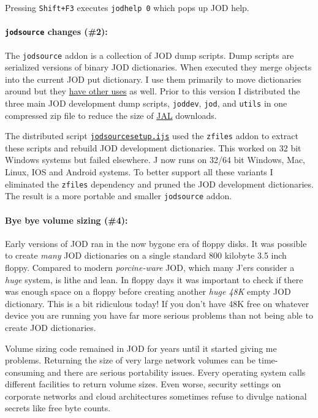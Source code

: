 \noindent Pressing \texttt{Shift+F3} executes \texttt{jodhelp\ 0} which pops up
JOD help.

\paragraph{\texorpdfstring{\texttt{jodsource} changes
(\#2)}{jodsource changes (\#2)}:}

The \texttt{jodsource} addon is a collection of JOD dump scripts. Dump
scripts are serialized versions of binary JOD dictionaries. When
executed they merge objects into the current JOD put dictionary. I use
them primarily to move dictionaries around but they
\href{https://github.com/bakerjd99/joddumps}{have other uses} as well.
Prior to this version I distributed the three main JOD development dump
scripts, \texttt{joddev}, \texttt{jod}, and \texttt{utils} in one
compressed zip file to reduce the size of
\href{http://www.jsoftware.com/jwiki/JAL}{JAL} downloads.

The distributed script
\href{https://github.com/bakerjd99/jod/blob/master/jodsource/jodsourcesetup.ijs}{\texttt{jodsourcesetup.ijs}}
used the \texttt{zfiles} addon to extract these scripts and rebuild JOD
development dictionaries. This worked on 32 bit Windows systems but
failed elsewhere. J now runs on 32/64 bit Windows, Mac, Linux, IOS and
Android systems. To better support all these variants I eliminated the
\texttt{zfiles} dependency and pruned the JOD development dictionaries.
The result is a more portable and smaller \texttt{jodsource} addon.

\paragraph{Bye bye volume sizing (\#4):}

Early versions of JOD ran in the now bygone era of floppy disks. It was
possible to create \emph{many} JOD dictionaries on a single standard 800
kilobyte 3.5 inch floppy. Compared to modern \emph{porcine-ware} JOD,
which many J'ers consider a \emph{huge} system, is lithe and lean. In
floppy days it was important to check if there was enough space on a
floppy before creating another \emph{huge 48K} empty JOD dictionary.
This is a bit ridiculous today! If you don't have 48K free on whatever
device you are running you have far more serious problems than not being
able to create JOD dictionaries.

Volume sizing code remained in JOD for years until it started giving me
problems. Returning the size of very large network volumes can be
time-consuming and there are serious portability issues. Every operating
system calls different facilities to return volume sizes. Even worse,
security settings on corporate networks and cloud architectures
sometimes refuse to divulge national secrets like free byte counts.

